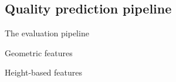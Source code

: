\documentclass[10pt, export]{beamer}
\begin{document}
        \subsection{Quality prediction pipeline}
            \begin{frame}{The evaluation pipeline}
                \begin{figure}
                    
                \end{figure}
            \end{frame}
            \begin{frame}{Geometric features}
                \begin{figure}
                    
                \end{figure}
            \end{frame}
            \begin{frame}{Height-based features}
                \begin{figure}
                    
                \end{figure}
            \end{frame}
\end{document}
